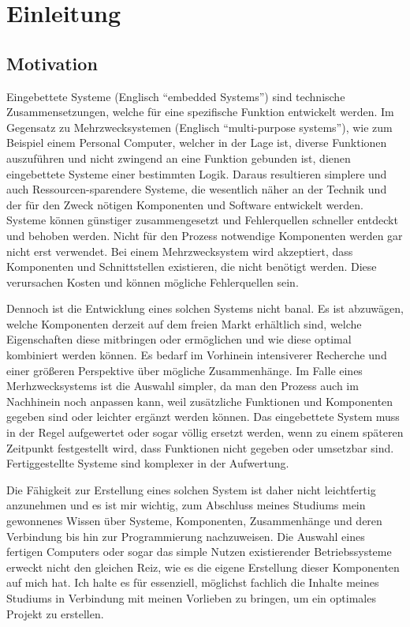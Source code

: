 \hypertarget{einleitung}{%
\chapter{Einleitung}\label{einleitung}}

\hypertarget{motivation}{%
\section{Motivation}\label{motivation}}

Eingebettete Systeme (Englisch ``embedded Systems'') sind technische
Zusammensetzungen, welche für eine spezifische Funktion entwickelt
werden. Im Gegensatz zu Mehrzwecksystemen (Englisch ``multi-purpose
systems''), wie zum Beispiel einem Personal Computer, welcher in der
Lage ist, diverse Funktionen auszuführen und nicht zwingend an eine
Funktion gebunden ist, dienen eingebettete Systeme einer bestimmten
Logik. Daraus resultieren simplere und auch Ressourcen-sparendere
Systeme, die wesentlich näher an der Technik und der für den Zweck
nötigen Komponenten und Software entwickelt werden. Systeme können
günstiger zusammengesetzt und Fehlerquellen schneller entdeckt und
behoben werden. Nicht für den Prozess notwendige Komponenten werden gar
nicht erst verwendet. Bei einem Mehrzwecksystem wird akzeptiert, dass
Komponenten und Schnittstellen existieren, die nicht benötigt werden.
Diese verursachen Kosten und können mögliche Fehlerquellen sein.

Dennoch ist die Entwicklung eines solchen Systems nicht banal. Es ist
abzuwägen, welche Komponenten derzeit auf dem freien Markt erhältlich
sind, welche Eigenschaften diese mitbringen oder ermöglichen und wie
diese optimal kombiniert werden können. Es bedarf im Vorhinein
intensiverer Recherche und einer größeren Perspektive über mögliche
Zusammenhänge. Im Falle eines Merhzwecksystems ist die Auswahl simpler,
da man den Prozess auch im Nachhinein noch anpassen kann, weil
zusätzliche Funktionen und Komponenten gegeben sind oder leichter
ergänzt werden können. Das eingebettete System muss in der Regel
aufgewertet oder sogar völlig ersetzt werden, wenn zu einem späteren
Zeitpunkt festgestellt wird, dass Funktionen nicht gegeben oder
umsetzbar sind. Fertiggestellte Systeme sind komplexer in der
Aufwertung.

Die Fähigkeit zur Erstellung eines solchen System ist daher nicht
leichtfertig anzunehmen und es ist mir wichtig, zum Abschluss meines
Studiums mein gewonnenes Wissen über Systeme, Komponenten, Zusammenhänge
und deren Verbindung bis hin zur Programmierung nachzuweisen. Die
Auswahl eines fertigen Computers oder sogar das simple Nutzen
existierender Betriebssysteme erweckt nicht den gleichen Reiz, wie es
die eigene Erstellung dieser Komponenten auf mich hat. Ich halte es für
essenziell, möglichst fachlich die Inhalte meines Studiums in Verbindung
mit meinen Vorlieben zu bringen, um ein optimales Projekt zu erstellen.

